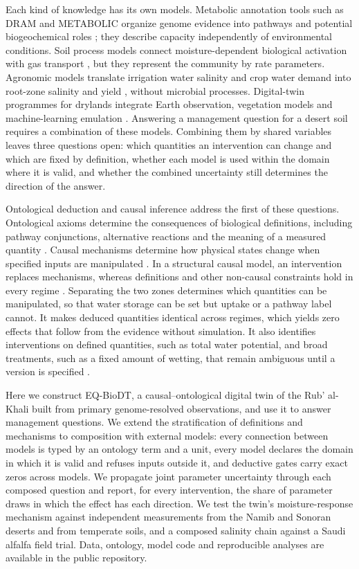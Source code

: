 \documentclass[11pt,a4paper]{article}
\begin{document}
Each kind of knowledge has its own models. Metabolic annotation tools such as DRAM and METABOLIC organize genome evidence into pathways and potential biogeochemical roles \cite{shaffer2020dram,zhou2022metabolic}; they describe capacity independently of environmental conditions. Soil process models connect moisture-dependent biological activation with gas transport \cite{bertagni2021moisture}, but they represent the community by rate parameters. Agronomic models translate irrigation water salinity and crop water demand into root-zone salinity and yield \cite{ayers1985fao29,allen1998fao56}, without microbial processes. Digital-twin programmes for drylands integrate Earth observation, vegetation models and machine-learning emulation \cite{twindrylands}. Answering a management question for a desert soil requires a combination of these models. Combining them by shared variables leaves three questions open: which quantities an intervention can change and which are fixed by definition, whether each model is used within the domain where it is valid, and whether the combined uncertainty still determines the direction of the answer.

Ontological deduction and causal inference address the first of these questions. Ontological axioms determine the consequences of biological definitions, including pathway conjunctions, alternative reactions and the meaning of a measured quantity \cite{owl2direct2012}. Causal mechanisms determine how physical states change when specified inputs are manipulated \cite{pearl2009causality}. In a structural causal model, an intervention replaces mechanisms, whereas definitions and other non-causal constraints hold in every regime \cite{bochman2015pearls}. Separating the two zones determines which quantities can be manipulated, so that water storage can be set but uptake or a pathway label cannot. It makes deduced quantities identical across regimes, which yields zero effects that follow from the evidence without simulation. It also identifies interventions on defined quantities, such as total water potential, and broad treatments, such as a fixed amount of wetting, that remain ambiguous until a version is specified \cite{spirtes2004ambiguous,vanderweele2013multiple}.

Here we construct EQ-BioDT, a causal--ontological digital twin of the Rub' al-Khali built from primary genome-resolved observations, and use it to answer management questions. We extend the stratification of definitions and mechanisms to composition with external models: every connection between models is typed by an ontology term and a unit, every model declares the domain in which it is valid and refuses inputs outside it, and deductive gates carry exact zeros across models. We propagate joint parameter uncertainty through each composed question and report, for every intervention, the share of parameter draws in which the effect has each direction. We test the twin's moisture-response mechanism against independent measurements from the Namib and Sonoran deserts and from temperate soils, and a composed salinity chain against a Saudi alfalfa field trial. Data, ontology, model code and reproducible analyses are available in the public repository.
\end{document}
